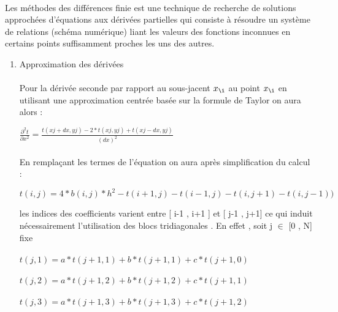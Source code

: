\documentclass{article}
\begin{document}
    \paragraph{} 
    Les méthodes des différences finie est une technique de recherche de solutions 
    approchées d’équations aux dérivées partielles qui consiste à résoudre un
    système de relations (schéma numérique) liant les valeurs des fonctions 
    inconnues en certains points suffisamment proches les uns des autres. 
   \begin{enumerate}
   	\item { Approximation des dérivées }
   	\paragraph{}
   
 	Pour la dérivée seconde par rapport au sous-jacent $ x_{\i}$ au point $ x_{\i}$ 
   en utilisant une approximation centrée basée sur la formule de Taylor  on aura alors : 
   	
   $	$$\frac{\partial^2 t}{\partial x^2}$$  = $$\frac{t( xj + dx , yj ) - 2*t( xj , yj ) + t( xj-dx , yj)}{(dx)^2 }$$ $ 
   
   \paragraph{}
   	En remplaçant les termes de l'équation %
   	on aura après simplification du calcul :
   	
   	$t ( i , j ) = 4 *b(i , j ) * h^2 - t(i+1 , j) - t(i-1 , j)-t(i , j+1)-t(i , j-1))$ 
   	
   	les indices des coefficients varient entre [ i-1 , i+1 ] et [ j-1 , j+1] 
   	ce qui induit nécessairement l'utilisation des blocs tridiagonales . En effet  , 
   	soit j $\in$ [0 , N] fixe 
   	\paragraph{}
   	$t(j,1) = a*t(j+1 , 1) + b*t(j+1,1) + c*t(j+1,0)$
   	\paragraph{}
    $t(j,2) = a*t(j+1 , 2) + b*t(j+1,2) + c*t(j+1,1)$
    \paragraph{}
    $t(j,3) = a*t(j+1 , 3) + b*t(j+1,3) + c*t(j+1,2)$ 

\end{enumerate}
\end{document}
